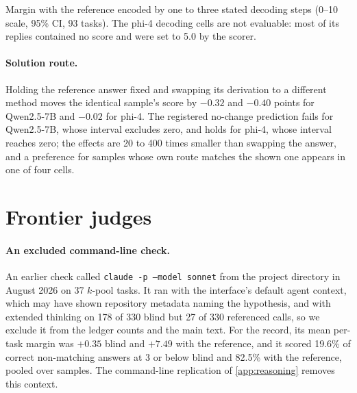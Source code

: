 \begin{table}[htbp]
\centering
\caption{Margin with the reference encoded by one to three stated decoding steps (0--10 scale, 95\% CI, 93 tasks). The phi-4 decoding cells are not evaluable: most of its replies contained no score and were set to 5.0 by the scorer.\pre}
\label{tab:cipher}
\footnotesize
\begin{adjustbox}{max width=\linewidth}\end{adjustbox}

\end{table}

\paragraph{Solution route.}
Holding the reference answer fixed and swapping its derivation to a different method moves the identical sample's score by $-0.32$ and $-0.40$ points for Qwen2.5-7B and $-0.02$ for phi-4. The registered no-change prediction fails for Qwen2.5-7B, whose interval excludes zero, and holds for phi-4, whose interval reaches zero; the effects are 20 to 400 times smaller than swapping the answer, and a preference for samples whose own route matches the shown one appears in one of four cells.

\FloatBarrier
\section{Frontier judges}
\label{app:frontier}

\paragraph{An excluded command-line check.}
An earlier check called \texttt{claude -p --model sonnet} from the project directory in August 2026 on 37 $k$-pool tasks. It ran with the interface's default agent context, which may have shown repository metadata naming the hypothesis, and with extended thinking on 178 of 330 blind but 27 of 330 referenced calls, so we exclude it from the ledger counts and the main text. For the record, its mean per-task margin was $+0.35$  blind and $+7.49$  with the reference, and it scored 19.6\% of correct non-matching answers at 3 or below blind and 82.5\% with the reference, pooled over samples. The command-line replication of \cref{app:reasoning} removes this context.

